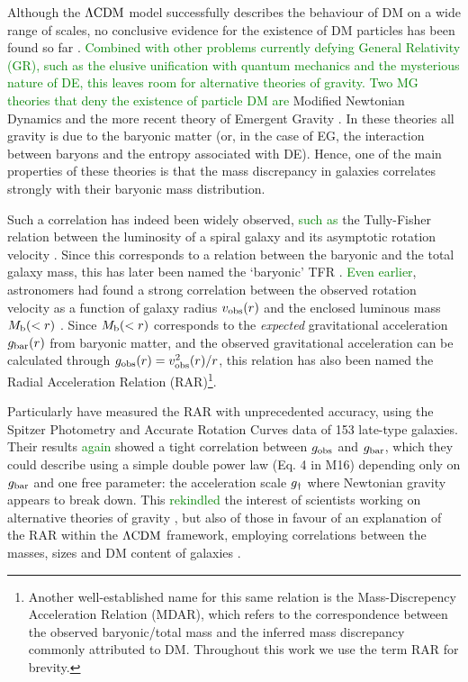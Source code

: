 \documentclass[usenatbib]{mnras}
\newcommand{\lcdm}{{\rm \Lambda CDM}}
\newcommand{\un}[1]{_{\rm #1}}
\begin{document}
Although the $\lcdm$ model successfully describes the behaviour of DM on a wide range of scales, no conclusive evidence for the existence of DM particles has been found so far \cite[despite years of enormous effort; for an overview, see][]{bertone2005,bertone2018}. \textcolor{Green}{Combined with other problems currently defying General Relativity (GR), such as the elusive unification with quantum mechanics and the mysterious nature of DE, this leaves room for alternative theories of gravity. Two MG theories that deny the existence of particle DM are} Modified Newtonian Dynamics \cite[MOND,][]{milgrom1983} and the more recent theory of Emergent Gravity \cite[EG,][]{verlinde2016}. In these theories all gravity is due to the baryonic matter (or, in the case of EG, the interaction between baryons and the entropy associated with DE). Hence, one of the main properties of these theories is that the mass discrepancy in galaxies correlates strongly with their baryonic mass distribution.

Such a correlation has indeed been widely observed, \textcolor{Green}{such as} the Tully-Fisher relation \cite[TFR,][]{tully1977} between the luminosity of a spiral galaxy and its asymptotic rotation velocity \cite[]{pierce1988,bernstein1994}. Since this corresponds to a relation between the baryonic and the total galaxy mass, this has later been named the `baryonic' TFR \cite[BTFR,][]{mcgaugh2000,mcgaugh2012}. \textcolor{Green}{Even earlier}, astronomers had found a strong correlation between the observed rotation velocity as a function of galaxy radius $v\un{obs}(r)$ and the enclosed luminous mass \mbox{$M\un{b}(<r)$} \cite[]{sanders1986,sanders1996,mcgaugh2004,sanders2007,wu2015}. Since $M\un{b}(<r)$ corresponds to the \emph{expected} gravitational acceleration $g\un{bar}(r)$ from baryonic matter, and the observed gravitational acceleration can be calculated through $g\un{obs}(r)=v\un{obs}^2(r)/r$, this relation has also been named the Radial Acceleration Relation (RAR)\footnote{Another well-established name for this same relation is the Mass-Discrepency Acceleration Relation (MDAR), which refers to the correspondence between the observed baryonic/total mass and the inferred mass discrepancy commonly attributed to DM. Throughout this work we use the term RAR for brevity.}.

Particularly \citet[][hereafter M16]{mcgaugh2016} have measured the RAR with unprecedented accuracy, using the Spitzer Photometry and Accurate Rotation Curves \cite[SPARC,][]{lelli2016b} data of 153 late-type galaxies. Their results \textcolor{Green}{again} showed a tight correlation between $g\un{obs}$ and $g\un{bar}$, which they could describe using a simple double power law (Eq. 4 in M16) depending only on $g\un{bar}$ and one free parameter: the acceleration scale $g\un{\dagger}$ where Newtonian gravity appears to break down. This \textcolor{Green}{rekindled} the interest of scientists working on alternative theories of gravity \cite[]{lelli2017a,lelli2017b,burrage2017,li2018,obrien2019}, but also of those in favour of an explanation of the RAR within the $\lcdm$ framework, employing correlations between the masses, sizes and DM content of galaxies \cite[]{keller2017,desmond2017,ludlow2017,tenneti2018}.
\end{document}
